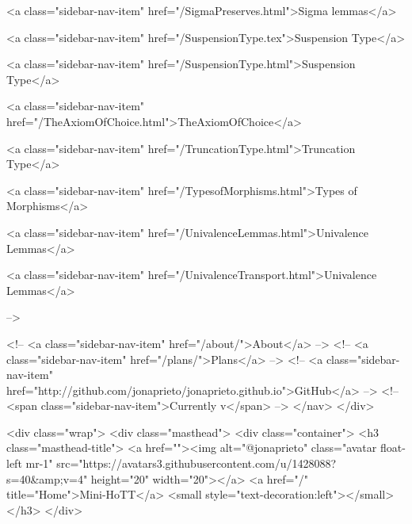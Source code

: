       
    
      
        
          <a class="sidebar-nav-item" href="/SigmaPreserves.html">Sigma lemmas</a>
        
      
    
      
        
          <a class="sidebar-nav-item" href="/SuspensionType.tex">Suspension Type</a>
        
      
    
      
        
          <a class="sidebar-nav-item" href="/SuspensionType.html">Suspension Type</a>
        
      
    
      
        
          <a class="sidebar-nav-item" href="/TheAxiomOfChoice.html">TheAxiomOfChoice</a>
        
      
    
      
        
          <a class="sidebar-nav-item" href="/TruncationType.html">Truncation Type</a>
        
      
    
      
        
          <a class="sidebar-nav-item" href="/TypesofMorphisms.html">Types of Morphisms</a>
        
      
    
      
        
          <a class="sidebar-nav-item" href="/UnivalenceLemmas.html">Univalence Lemmas</a>
        
      
    
      
        
          <a class="sidebar-nav-item" href="/UnivalenceTransport.html">Univalence Lemmas</a>
        
      
     -->

    <!-- <a class="sidebar-nav-item" href="/about/">About</a> -->
    <!-- <a class="sidebar-nav-item" href="/plans/">Plans</a> -->
    <!-- <a class="sidebar-nav-item" href="http://github.com/jonaprieto/jonaprieto.github.io">GitHub</a> -->
    <!-- <span class="sidebar-nav-item">Currently v</span> -->
  </nav>
</div>

    <div class="wrap">
      <div class="masthead">
        <div class="container">
          <h3 class="masthead-title">
            <a href=""><img alt="@jonaprieto" class="avatar float-left mr-1" src="https://avatars3.githubusercontent.com/u/1428088?s=40&amp;v=4" height="20" width="20"></a>
            <a href="/" title="Home">Mini-HoTT</a>
            <small style="text-decoration:left"></small>
          </h3>
        </div>
      
